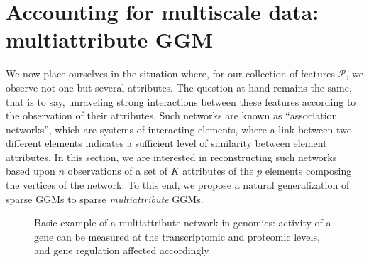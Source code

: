 \section{Accounting for multiscale data: multiattribute GGM}
\label{sec:multiattribute_ggm}

We now place  ourselves in the situation where, for  our collection of
features $\mathcal{P}$, we observe not one but several attributes. The
question at hand  remains the same, that is to  say, unraveling strong
interactions between  these features  according to the  observation of
their   attributes.   Such   networks  are   known  as   ``association
networks'', which  are systems of  interacting elements, where  a link
between  two  different  elements  indicates  a  sufficient  level  of
similarity  between  element  attributes.   In this  section,  we  are
interested in reconstructing such networks based upon $n$ observations
of a set of $K$ attributes  of the $p$ elements composing the vertices
of the  network. To this end,  we propose a natural  generalization of
sparse GGMs to sparse \emph{multiattribute} GGMs.

\begin{figure}[htbp!]
  \centering
  \caption{Basic example of a multiattribute network in genomics:
    activity  of a  gene  can  be measured  at  the transcriptomic  and
    proteomic levels, and gene regulation affected accordingly}
\label{fig:central_dogma}
\end{figure}

